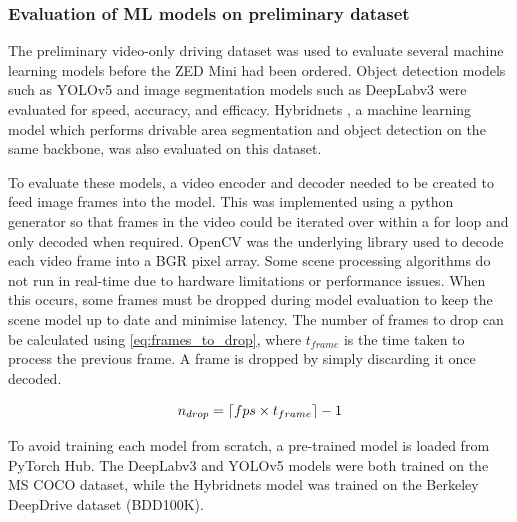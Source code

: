 \subsubsection{Evaluation of ML models on preliminary dataset}
The preliminary video-only driving dataset was used to evaluate
several machine learning models before the ZED Mini had been ordered.
Object detection models such as YOLOv5 \cite{ultralyticsYOLOv5} and image segmentation models such as
DeepLabv3 \cite{chenRethinkingAtrousConvolution2017} were evaluated for speed, accuracy, and efficacy.
Hybridnets \cite{vuHybridNetsEndtoEndPerception2022}, a machine learning model which
performs drivable area segmentation and object detection on the same backbone, was also evaluated on
this dataset.

To evaluate these models, a video encoder and decoder needed to be created
to feed image frames into the model. This was implemented using a python generator
so that frames in the video could be iterated over within a for loop and only decoded
when required. OpenCV \cite{bradskiOpenCVLibrary2000} was the underlying library used
to decode each video frame into a BGR pixel array.
Some scene processing algorithms do not run in real-time due to hardware limitations or performance issues.
When this occurs, some frames must be dropped during model evaluation to keep the scene model up to date and minimise latency.
The number of frames to drop can be calculated using \cref{eq:frames_to_drop},
where $t_{frame}$ is the time taken to process the previous frame.
A frame is dropped by simply discarding it once decoded.

\begin{equation}
n_{drop} = \lceil fps\times t_{frame}\rceil - 1
\label{eq:frames_to_drop}
\end{equation}

To avoid training each model from scratch, a pre-trained model is loaded from PyTorch Hub.
The DeepLabv3 and YOLOv5 models were both trained on the MS COCO \cite{linMicrosoftCOCOCommon2014} dataset,
while the Hybridnets model was trained on the Berkeley DeepDrive dataset \cite{yuBDD100KDiverseDriving2018} (BDD100K).



